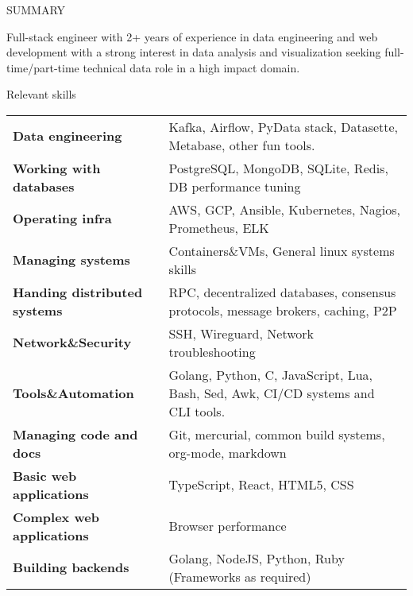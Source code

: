 \documentclass{resume} %
\begin{document}

\begin{rSection}{SUMMARY}

  {Full-stack engineer with 2+ years of experience in data engineering and web development with a strong interest in data analysis and visualization seeking full-time/part-time technical data role in a high impact domain.}


\end{rSection}

\begin{rSection}{Relevant skills}
  \begin{tabular}{ @{} >{\bfseries}l @{\hspace{6ex}} l }
    Data engineering & Kafka, Airflow, PyData stack, Datasette, Metabase, other fun tools.\\
    Working with databases & PostgreSQL, MongoDB, SQLite, Redis, DB performance tuning\\
    Operating infra & AWS, GCP, Ansible, Kubernetes, Nagios, Prometheus, ELK\\
    Managing systems & Containers\&VMs, General linux systems skills\\
    Handing distributed systems & RPC, decentralized databases, consensus protocols, message brokers, caching, P2P\\
    Network\&Security & SSH, Wireguard, Network troubleshooting\\
    Tools\&Automation & Golang, Python, C, JavaScript, Lua, Bash, Sed, Awk, CI/CD systems and CLI tools.\\
    Managing code and docs & Git, mercurial, common build systems, org-mode, markdown\\
    Basic web applications & TypeScript, React, HTML5, CSS\\
    Complex web applications & Browser performance\\
    Building backends & Golang, NodeJS, Python, Ruby (Frameworks as required)\\
  \end{tabular}\
\end{rSection}
\end{document}
